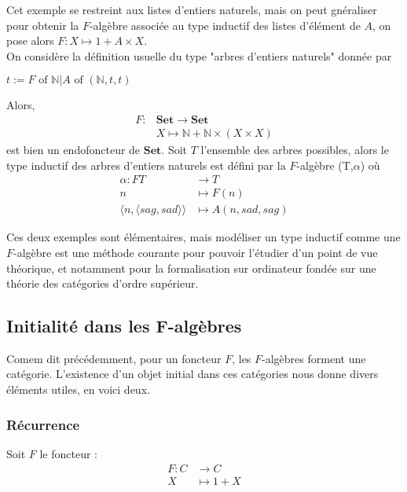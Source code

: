 \documentclass{article}
\newcommand{\N}{\mathbb{N}}
\begin{document}
Cet exemple se restreint aux listes d'entiers naturels, mais on peut gnéraliser pour obtenir la $F$-algèbre associée au type inductif des listes d'élément de $A$, on pose alors $F : X \mapsto 1 + A \times X$. 
\\ 
On considère la définition usuelle du type "arbres d'entiers naturels" donnée par 
\begin{center}
    $t := F \text{ of }  \N |  A \text{ of } ( \N , t, t)$
\end{center}
Alors, 
\begin{align*}
F : & \mathbf{Set} \rightarrow \mathbf{Set} \\       
    & X \mapsto \N + \N \times (X \times X)
\end{align*}
est bien un endofoncteur de $\mathbf{Set}$.
Soit $T$ l'ensemble des arbres possibles, alors le type inductif des arbres d'entiers naturels est défini par la $F$-algèbre  (T,$\alpha$) où 
\begin{align*}
\alpha :  FT &  \rightarrow T \\
            n & \mapsto F(n)  \\ 
      \langle n, \langle sag, sad \rangle \rangle &\mapsto A (n, sad, sag)
\end{align*}

Ces deux exemples sont élémentaires, mais modéliser un type inductif comme une $F$-algèbre est une méthode courante pour pouvoir l'étudier d'un point de vue théorique, et notamment pour la formalisation sur ordinateur fondée sur une théorie des catégories d'ordre supérieur.

\subsection{Initialité dans les F-algèbres}

Comem dit précédemment, pour un foncteur $F$, les $F$-algèbres forment une catégorie. L'existence d'un objet initial dans ces catégories nous donne divers éléments utiles, en voici deux. 

\subsubsection{Récurrence}

Soit $F$ le foncteur : 
\begin{align*}
    F : C & \rightarrow C \\ 
    X & \mapsto 1 + X
\end{align*}
\end{document}

